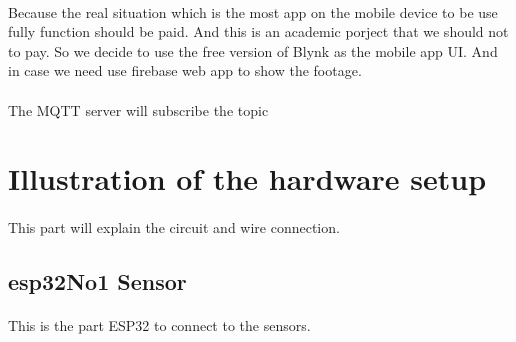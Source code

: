 \documentclass[a4paper, 12pt]{article}        %
\begin{document}
    \paragraph{}
    Because the real situation which is the most app on the mobile device to be use fully function should be paid.
    And this is an academic porject that we should not to pay. So we decide to use the free version of Blynk as the
    mobile app UI. And in case we need use firebase web app to show the footage.

    \paragraph{}
    The MQTT server will subscribe the topic
    \pagebreak
    \section{Illustration of the hardware setup}\label{sec:illustration-of-the-hardware-setup}
    \paragraph{}
    This part will explain the circuit and wire connection.

    \blindtext{}


    \pagebreak
    \subsection{esp32No1 Sensor}\label{subsec:esp32no1-sensor}
    \paragraph{}
    This is the part ESP32 to connect to the sensors.

    \blindtext{}
\end{document}
